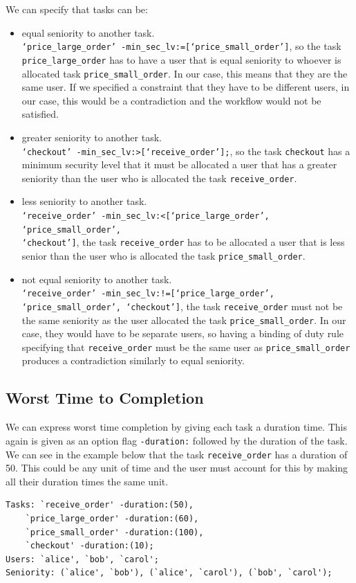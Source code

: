 \documentclass[a4paper]{report}
\begin{document}
We can specify that tasks can be:
\begin{itemize}
\item equal seniority to another task. \\
\texttt{`price\_large\_order' -min\_sec\_lv:=[`price\_small\_order']}, so the task\\ \texttt{price\_large\_order} has to have a user that is equal seniority to whoever is allocated task \texttt{price\_small\_order}. In our case, this means that they are the same user. If we specified a constraint that they have to be different users, in our case, this would be a contradiction and the workflow would not be satisfied.
\item greater seniority to another task.\\ 
\texttt{`checkout' -min\_sec\_lv:>[`receive\_order'];}, so the task \texttt{checkout} has a minimum security level that it must be allocated a user that has a greater seniority than the user who is allocated the task \texttt{receive\_order}.
\item less seniority to another task.\\
\texttt{`receive\_order' -min\_sec\_lv:<[`price\_large\_order', `price\_small\_order',}\\ \texttt{`checkout']}, the task \texttt{receive\_order} has to be allocated a user that is less senior than the user who is allocated the task \texttt{price\_small\_order}.
\item not equal seniority to another task.\\
\texttt{`receive\_order' -min\_sec\_lv:!=[`price\_large\_order', `price\_small\_order', `checkout']}, the task \texttt{receive\_order} must not be the same seniority as the user allocated the task \texttt{price\_small\_order}. In our case, they would have to be separate users, so having a binding of duty rule specifying that \texttt{receive\_order} must be the same user as \texttt{price\_small\_order} produces a contradiction similarly to equal seniority.
\end{itemize}

\subsection{Worst Time to Completion}
We can express worst time completion by giving each task a duration time. This again is given as an option flag \texttt{-duration:} followed by the duration of the task. We can see in the example below that the task \texttt{receive\_order} has a duration of 50. This could be any unit of time and the user must account for this by making all their duration times the same unit.
\begin{center}
\begin{minipage}{\linewidth}
\begin{lstlisting}[frame=single]
Tasks: `receive_order' -duration:(50), 
	`price_large_order' -duration:(60), 
	`price_small_order' -duration:(100), 
	`checkout' -duration:(10); 
Users: `alice', `bob', `carol'; 
Seniority: (`alice', `bob'), (`alice', `carol'), (`bob', `carol');
\end{lstlisting}
\end{minipage}
\end{center}
\end{document}
